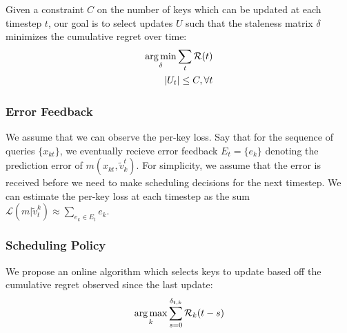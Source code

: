 Given a constraint $C$ on the number of keys which can be updated at each timestep $t$, our goal is to select updates $U$ such that the staleness matrix $\delta$ minimizes the cumulative regret over time: 
\begin{align}
     \operatorname*{arg\,min}_\delta \sum_t \mathcal{R}(t) \\
     |U_t| \le C, \forall{t}
\end{align}
\subsubsection{Error Feedback}
We assume that we can observe the per-key loss. Say that for the sequence of queries $\{x_{kt}\}$, we eventually recieve error feedback $E_t = \{e_k\}$ denoting the prediction error of $m(x_{kt}, \tilde{v}_k^t)$. For simplicity, we assume that the error is received before we need to make scheduling decisions for the next timestep. We can estimate the per-key loss at each timestep as the sum $\mathcal{L}(m|\tilde{v}_t^ k) \approx \sum_{e_k \in E_t} e_k$.

\subsubsection{Scheduling Policy}
\label{ss:scheduling-policy}
We propose an online algorithm which selects keys to update based off the cumulative regret observed since the last update: 
\begin{equation}
   \operatorname*{arg\,max}_k \sum_{s=0}^{\delta_{t,k}} \mathcal{R}_k(t-s) 
   \label{eq:cumulative_regret}
\end{equation}

